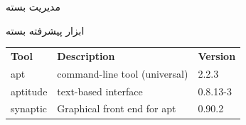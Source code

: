 \documentclass[hyperref={colorlinks}]{beamer}
\begin{document}
\begin{persian}
\begin{frame}{مدیریت بسته}
\begin{block}{ابزار پیشرفته بسته}
\vspace{0.5cm}

\begin{latin}
\begin{tabular}{lll} 
\textbf{Tool} & \textbf{Description} & \textbf{Version} \\
apt & command-line tool (universal) & 2.2.3 \\
aptitude & text-based interface & 0.8.13-3 \\
synaptic & Graphical front end for apt & 0.90.2 \\ 
\end{tabular}
\end{latin}



\end{block}
\end{frame}
\end{persian}
\end{document}
